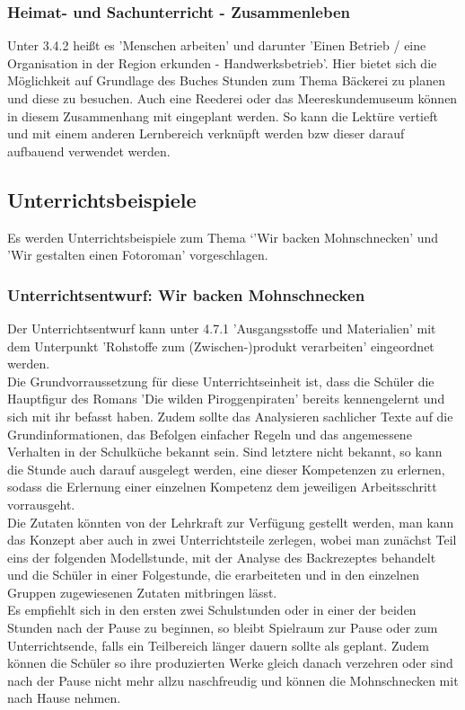 \subsubsection{Heimat- und Sachunterricht - Zusammenleben}

Unter 3.4.2 heißt es 'Menschen arbeiten' und darunter 'Einen Betrieb / eine Organisation in der Region erkunden - Handwerksbetrieb'.\cite[S.196]{LP}  Hier bietet sich die Möglichkeit auf Grundlage des Buches Stunden zum Thema Bäckerei zu planen und diese zu besuchen. Auch eine Reederei oder das Meereskundemuseum können in diesem Zusammenhang mit eingeplant werden. So kann die Lektüre vertieft und mit einem anderen Lernbereich verknüpft werden bzw dieser darauf aufbauend verwendet werden.


\subsection{Unterrichtsbeispiele}

Es werden Unterrichtsbeispiele zum Thema `'Wir backen Mohnschnecken' und 'Wir gestalten einen Fotoroman' vorgeschlagen. 

\subsubsection{Unterrichtsentwurf: Wir backen Mohnschnecken}

Der Unterrichtsentwurf kann unter 4.7.1 'Ausgangsstoffe und Materialien' mit dem Unterpunkt 'Rohstoffe zum (Zwischen-)produkt verarbeiten' \cite[S.268]{LP} eingeordnet werden.
\\
Die Grundvorraussetzung für diese Unterrichtseinheit ist, dass die Schüler die Hauptfigur des Romans 'Die wilden Piroggenpiraten' bereits kennengelernt und sich mit ihr befasst haben. Zudem sollte das Analysieren sachlicher Texte auf die Grundinformationen, das Befolgen einfacher Regeln und das angemessene Verhalten in der Schulküche bekannt sein. Sind letztere nicht bekannt, so kann die Stunde auch darauf ausgelegt werden, eine dieser Kompetenzen zu erlernen, sodass die Erlernung einer einzelnen Kompetenz dem jeweiligen Arbeitsschritt vorrausgeht.
\\
Die Zutaten könnten von der Lehrkraft zur Verfügung gestellt werden, man kann das Konzept aber auch in zwei Unterrichtsteile zerlegen, wobei man zunächst Teil eins der folgenden Modellstunde, mit der Analyse des Backrezeptes behandelt und die Schüler in einer Folgestunde, die erarbeiteten und in den einzelnen Gruppen zugewiesenen Zutaten mitbringen lässt.
\\
Es empfiehlt sich in den ersten zwei Schulstunden oder in einer der beiden Stunden nach der Pause zu beginnen, so bleibt Spielraum zur Pause oder zum Unterrichtsende, falls ein Teilbereich länger dauern sollte als geplant. Zudem können die Schüler so ihre produzierten Werke gleich danach verzehren oder sind nach der Pause nicht mehr allzu naschfreudig und können die Mohnschnecken mit nach Hause nehmen.

